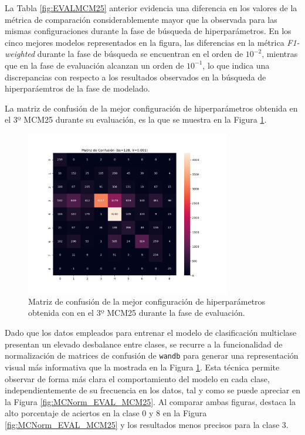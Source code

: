 La Tabla \ref{fig:EVALMCM25} anterior evidencia una diferencia en los valores de la métrica de comparación considerablemente mayor que la observada para las mismas configuraciones durante la fase de búsqueda de hiperparámetros. En los cinco mejores modelos representados en la figura, las diferencias en la métrica \textit{F1-weighted} durante la fase de búsqueda se encuentran en el orden de $10^{-2}$, mientras que en la fase de evaluación alcanzan un orden de $10^{-1}$, lo que indica una discrepancias con respecto a los resultados observados en la búsqueda de hiperparáemtros de la fase de modelado.

La matriz de confusión de la mejor configuración de hiperparámetros obtenida en el 3º MCM25 durante su evaluación, es la que se muestra en la Figura \ref{fig:MC_EVAL_MCM25}.

\begin{figure}[H]
    \centering
    \includegraphics[width=0.8\textwidth]{./img/evaluacion/matrices_confusion/MC_EVAL_MCM25.png}
    \caption{Matriz de confusión de la mejor configuración de hiperparámetros obtenida con en el 3º MCM25 durante la fase de evaluación.}
    \label{fig:MC_EVAL_MCM25}
\end{figure}

Dado que los datos empleados para entrenar el modelo de clasificación multiclase presentan un elevado desbalance entre clases, se recurre a la funcionalidad de normalización de matrices de confusión de \texttt{wandb} para generar una representación visual más informativa que la mostrada en la Figura \ref{fig:MC_EVAL_MCM25}. Esta técnica permite observar de forma más clara el comportamiento del modelo en cada clase, independientemente de su frecuencia en los datos, tal y como se puede apreciar en la Figura \ref{fig:MCNorm_EVAL_MCM25}. Al comparar ambas figuras, destaca la alto porcentaje de aciertos en la clase 0 y 8 en la Figura \ref{fig:MCNorm_EVAL_MCM25} y los resultados menos precisos para la clase 3.

